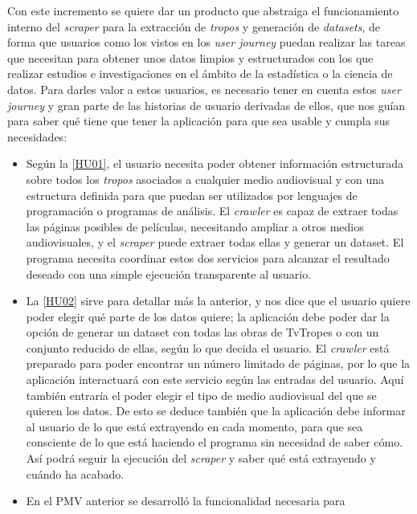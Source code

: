 Con este incremento se quiere dar un producto que abstraiga el funcionamiento
interno del \textit{scraper} para la extracción de \textit{tropos} y generación
de \textit{datasets}, de forma que usuarios como los vistos en los \textit{user
journey} puedan realizar las tareas que necesitan para obtener unos datos
limpios y estructurados con los que realizar estudios e investigaciones en el
ámbito de la estadística o la ciencia de datos. Para darles valor a estos
usuarios, es necesario tener en cuenta estos \textit{user journey} y gran parte
de las historias de usuario derivadas de ellos, que nos guían para saber qué
tiene que tener la aplicación para que sea usable y cumpla sus necesidades:

\begin{itemize}
    \item Según la
    \href{https://github.com/jlgallego99/TropesToGo/issues/6}{[HU01]}, el
    usuario necesita poder obtener información estructurada sobre todos los
    \textit{tropos} asociados a cualquier medio audiovisual y con una estructura
    definida para que puedan ser utilizados por lenguajes de programación o
    programas de análisis. El \textit{crawler} es capaz de extraer todas las
    páginas posibles de películas, necesitando ampliar a otros medios
    audiovisuales, y el \textit{scraper} puede extraer todas ellas y generar un
    dataset. El programa necesita coordinar estos dos servicios para alcanzar el
    resultado deseado con una simple ejecución transparente al usuario.
    \item La \href{https://github.com/jlgallego99/TropesToGo/issues/7}{[HU02]}
    sirve para detallar más la anterior, y nos dice que el usuario quiere poder
    elegir qué parte de los datos quiere; la aplicación debe poder dar la opción
    de generar un dataset con todas las obras de TvTropes o con un conjunto
    reducido de ellas, según lo que decida el usuario. El \textit{crawler} está
    preparado para poder encontrar un número limitado de páginas, por lo que la
    aplicación interactuará con este servicio según las entradas del usuario.
    Aquí también entraría el poder elegir el tipo de medio audiovisual del que
    se quieren los datos. De esto se deduce también que la aplicación debe
    informar al usuario de lo que está extrayendo en cada momento, para que sea
    consciente de lo que está haciendo el programa sin necesidad de saber cómo.
    Así podrá seguir la ejecución del \textit{scraper} y saber qué está
    extrayendo y cuándo ha acabado.
    \item En el PMV anterior se desarrolló la funcionalidad necesaria para

\end{itemize}
